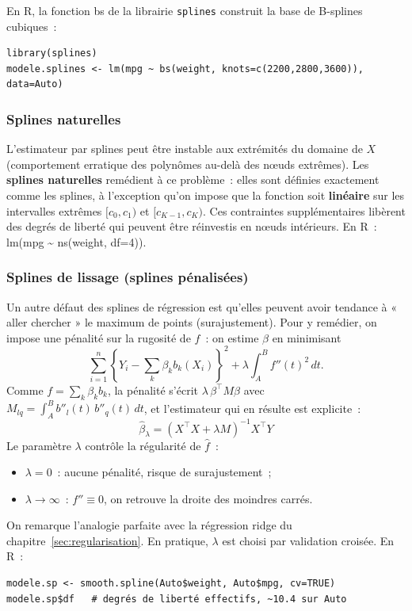 \documentclass[11pt,letterpaper]{article}
\begin{document}
En \textrm{R}, la fonction \textsf{bs} de la librairie \texttt{splines} construit la base de B-splines cubiques~:
\begin{verbatim}
library(splines)
modele.splines <- lm(mpg ~ bs(weight, knots=c(2200,2800,3600)), data=Auto)
\end{verbatim}

\subsubsection{Splines naturelles}

L'estimateur par splines peut être instable aux extrémités du domaine de $X$ (comportement erratique des polynômes au-delà des n\oe uds extrêmes). Les \textbf{splines naturelles} remédient à ce problème~: elles sont définies exactement comme les splines, à l'exception qu'on impose que la fonction soit \textbf{linéaire} sur les intervalles extrêmes $[c_0,c_1)$ et $[c_{K-1},c_K)$. Ces contraintes supplémentaires libèrent des degrés de liberté qui peuvent être réinvestis en n\oe uds intérieurs. En \textrm{R}~: \textsf{lm(mpg \textasciitilde{} ns(weight, df=4))}.

\subsubsection{Splines de lissage (splines pénalisées)}

Un autre défaut des splines de régression est qu'elles peuvent avoir tendance à « aller chercher » le maximum de points (surajustement). Pour y remédier, on impose une pénalité sur la rugosité de $f$~: on estime $\beta$ en minimisant
$$\sum_{i=1}^n\left\{Y_i - \sum_{k}\beta_k b_k(X_i)\right\}^2 + \lambda\int_A^B f''(t)^2\,dt.$$
Comme $f = \sum_k \beta_k b_k$, la pénalité s'écrit $\lambda\,\beta^\top M\beta$ avec $M_{lq} = \int_A^B b''_l(t)\,b''_q(t)\,dt$, et l'estimateur qui en résulte est explicite~:
$$\boxed{\hat\beta_\lambda = (X^\top X + \lambda M)^{-1}X^\top Y}$$
Le paramètre $\lambda$ contrôle la régularité de $\hat f$~:
\begin{itemize}
\item $\lambda = 0$~: aucune pénalité, risque de surajustement~;
\item $\lambda\to\infty$~: $f''\equiv 0$, on retrouve la droite des moindres carrés.
\end{itemize}
On remarque l'analogie parfaite avec la régression ridge du chapitre~\ref{sec:regularisation}. En pratique, $\lambda$ est choisi par validation croisée. En \textrm{R}~:
\begin{verbatim}
modele.sp <- smooth.spline(Auto$weight, Auto$mpg, cv=TRUE)
modele.sp$df   # degrés de liberté effectifs, ~10.4 sur Auto
\end{verbatim}
\end{document}
